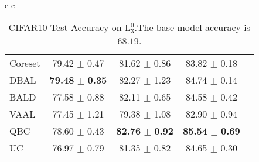 \documentclass[10pt,twocolumn,letterpaper]{article}
\begin{document}
\begin{table}[ht]
\begin{center}
\begin{tabular}{c c}
\begin{minipage}{0.5\linewidth}
{\begin{tabular}{l|cccc}
        Coreset & 79.42 $\pm$ 0.47 & 81.62 $\pm$ 0.86 & 83.82 $\pm$ 0.18\\
        DBAL & \textbf{79.48} $\pm$ \textbf{0.35} & 82.27 $\pm$ 1.23 & 84.74 $\pm$ 0.14 \\
        BALD & 77.58 $\pm$ 0.88 & 82.11 $\pm$ 0.65 & 84.58 $\pm$ 0.42\\
        VAAL & 77.45 $\pm$ 1.21 & 79.38 $\pm$ 1.08 & 82.90 $\pm$ 0.94\\
        QBC & 78.60 $\pm$ 0.43 & \textbf{82.76} $\pm$ \textbf{0.92} & \textbf{85.54} $\pm$ \textbf{0.69}\\
        UC & 76.97 $\pm$ 0.79 & 81.35 $\pm$ 0.82 & 84.65 $\pm$ 0.30 \\
        \bottomrule
        \end{tabular}}
        \caption{CIFAR10 Test Accuracy on L$_{3}^{0}$.The base model accuracy is $68.19$.}
        \label{tab:CIFAR10_exp_budget_10k_1}
        
    \end{minipage}
    
        
        \end{tabular}
        
\end{center}
\end{table}
\end{document}

